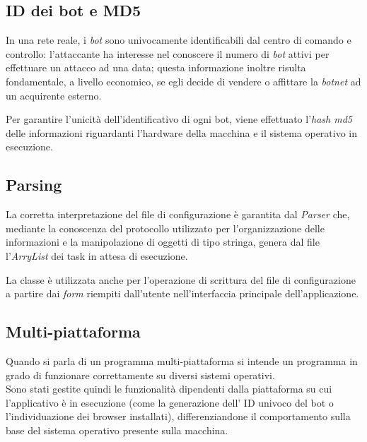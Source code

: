 \vspace*{0.5cm}
\subsection{ID dei bot e MD5}
In una rete reale, i \textit{bot} sono univocamente identificabili dal centro di comando e controllo:
l'attaccante ha interesse nel conoscere il numero di \textit{bot} attivi per effettuare un attacco ad una data; questa informazione inoltre risulta fondamentale, a livello economico, se egli decide di vendere o affittare la \textit{botnet} ad un acquirente esterno. 

Per garantire l'unicit\`{a} dell'identificativo di ogni bot, viene effettuato l'\textit{hash md5} delle informazioni riguardanti l'hardware della macchina e il sistema operativo in esecuzione.

\vspace*{0.5cm}
\subsection{Parsing}
La corretta interpretazione del file di configurazione \`{e} garantita dal \textit{Parser} che, mediante la conoscenza del protocollo utilizzato per l'organizzazione delle informazioni e la manipolazione di oggetti di tipo stringa, genera dal file l'\textit{ArryList} dei task in attesa di esecuzione. 

La classe \`{e} utilizzata anche per l'operazione di scrittura del file di configurazione a partire dai \textit{form} riempiti dall'utente nell'interfaccia principale dell'applicazione.

\vspace*{0.5cm}
\subsection{Multi-piattaforma}
Quando si parla di un programma multi-piattaforma si intende un programma in grado di funzionare correttamente su diversi sistemi operativi.\\
Sono stati gestite quindi le funzionalit\`{a} dipendenti dalla piattaforma su cui l'applicativo \`{e} in esecuzione (come la generazione dell' ID univoco del bot o l'individuazione dei browser installati), differenziandone il comportamento sulla base del sistema operativo presente sulla macchina.

\vspace*{0.5cm}
